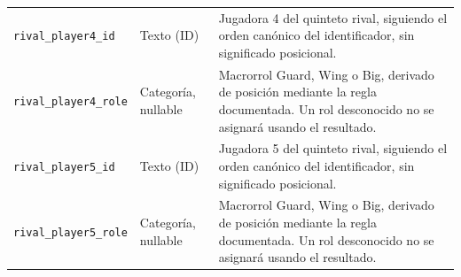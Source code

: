 \begin{longtable}{@{}>{\raggedright\arraybackslash}p{5.0cm}>{\raggedright\arraybackslash}p{1.9cm}>{\raggedright\arraybackslash}p{7.7cm}@{}}
\texttt{rival\_\allowbreak player4\_\allowbreak id} & Texto (ID) & Jugadora 4 del quinteto rival, siguiendo el orden canónico del identificador, sin significado posicional.\\
\texttt{rival\_\allowbreak player4\_\allowbreak role} & Categoría, nullable & Macrorrol Guard, Wing o Big, derivado de posición mediante la regla documentada. Un rol desconocido no se asignará usando el resultado.\\
\texttt{rival\_\allowbreak player5\_\allowbreak id} & Texto (ID) & Jugadora 5 del quinteto rival, siguiendo el orden canónico del identificador, sin significado posicional.\\
\texttt{rival\_\allowbreak player5\_\allowbreak role} & Categoría, nullable & Macrorrol Guard, Wing o Big, derivado de posición mediante la regla documentada. Un rol desconocido no se asignará usando el resultado.\\
\end{longtable}
\endgroup
\begingroup
\small
{}
\setlength{\tabcolsep}{4pt}
\renewcommand{\arraystretch}{1.15}
